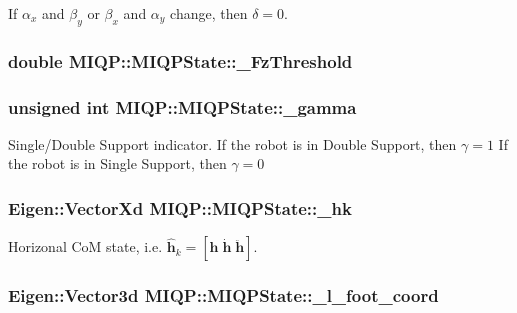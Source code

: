 \-If $\alpha_x$ and $\beta_y$ or $\beta_x$ and $\alpha_y$ change, then $\delta = 0$. \hypertarget{classMIQP_1_1MIQPState_a9eb5039dd699292c419f39514965e359}{
\subsubsection[{\-\_\-\-Fz\-Threshold}]{\setlength{\rightskip}{0pt plus 5cm}double {\bf \-M\-I\-Q\-P\-::\-M\-I\-Q\-P\-State\-::\-\_\-\-Fz\-Threshold}}}\label{classMIQP_1_1MIQPState_a9eb5039dd699292c419f39514965e359}
\hypertarget{classMIQP_1_1MIQPState_ab82daf9a470a885186cb733c4d4a72f8}{
\subsubsection[{\-\_\-gamma}]{\setlength{\rightskip}{0pt plus 5cm}unsigned int {\bf \-M\-I\-Q\-P\-::\-M\-I\-Q\-P\-State\-::\-\_\-gamma}}}\label{classMIQP_1_1MIQPState_ab82daf9a470a885186cb733c4d4a72f8}
\-Single/\-Double \-Support indicator. \-If the robot is in \-Double \-Support, then $\gamma = 1$ \-If the robot is in \-Single \-Support, then $\gamma = 0$ \hypertarget{classMIQP_1_1MIQPState_a1fa7e57c280b3cf451275fb9c617182b}{
\subsubsection[{\-\_\-hk}]{\setlength{\rightskip}{0pt plus 5cm}\-Eigen\-::\-Vector\-Xd {\bf \-M\-I\-Q\-P\-::\-M\-I\-Q\-P\-State\-::\-\_\-hk}}}\label{classMIQP_1_1MIQPState_a1fa7e57c280b3cf451275fb9c617182b}
\-Horizonal \-Co\-M state, i.\-e. $\hat{\mathbf{h}}_k = [\mathbf{h}\;\dot{\mathbf{h}}\;\ddot{\mathbf{h}}]$. \hypertarget{classMIQP_1_1MIQPState_a3027b3e93ce4c18f184c52438bed6e6a}{
\subsubsection[{\-\_\-l\-\_\-foot\-\_\-coord}]{\setlength{\rightskip}{0pt plus 5cm}\-Eigen\-::\-Vector3d {\bf \-M\-I\-Q\-P\-::\-M\-I\-Q\-P\-State\-::\-\_\-l\-\_\-foot\-\_\-coord}}}\label{classMIQP_1_1MIQPState_a3027b3e93ce4c18f184c52438bed6e6a}
